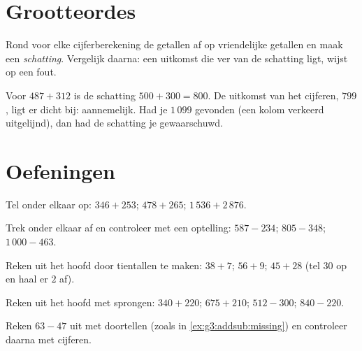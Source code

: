 \section{Grootteordes}

\begin{method}\label{met:g3:addsub:estimate}
Rond voor elke cijferberekening de getallen af op vriendelijke getallen
en maak een \emph{schatting}. Vergelijk daarna: een uitkomst die ver van
de schatting ligt, wijst op een fout.
\end{method}

\begin{example}
Voor $487 + 312$ is de schatting $500 + 300 = 800$. De uitkomst van het
cijferen, $799$, ligt er dicht bij: aannemelijk. Had je $1\,099$
gevonden (een kolom verkeerd uitgelijnd), dan had de schatting je
gewaarschuwd.
\end{example}

\section{Oefeningen}

\begin{exercise}[$\star$]\label{exo:g3:addsub:1}
Tel onder elkaar op: $346 + 253$; \quad $478 + 265$; \quad
$1\,536 + 2\,876$.
\end{exercise}

\begin{exercise}[$\star$]\label{exo:g3:addsub:2}
Trek onder elkaar af en controleer met een optelling: $587 - 234$; \quad
$805 - 348$; \quad $1\,000 - 463$.
\end{exercise}

\begin{exercise}[$\star$]\label{exo:g3:addsub:3}
Reken uit het hoofd door tientallen te maken: $38 + 7$; \quad $56 + 9$;
\quad $45 + 28$ (tel $30$ op en haal er $2$ af).
\end{exercise}

\begin{exercise}[$\star$]\label{exo:g3:addsub:4}
Reken uit het hoofd met sprongen: $340 + 220$; \quad $675 + 210$; \quad
$512 - 300$; \quad $840 - 220$.
\end{exercise}

\begin{exercise}[$\star$]\label{exo:g3:addsub:5}
Reken $63 - 47$ uit met doortellen (zoals in
\cref{ex:g3:addsub:missing}) en controleer daarna met cijferen.
\end{exercise}

